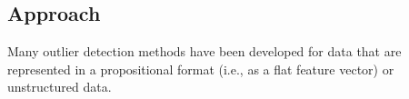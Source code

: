 %
% 					
 \subsection{Approach}
 Many outlier detection methods have been developed for data that are represented in a propositional format (i.e., as a flat feature vector) or unstructured data.
 
